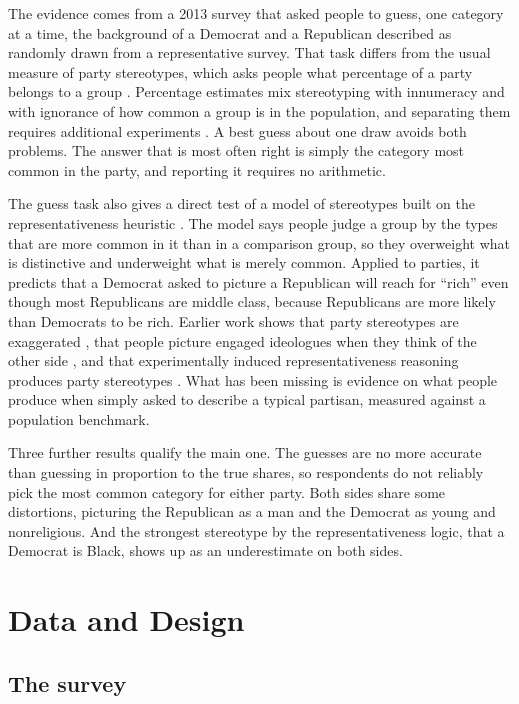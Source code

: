 \documentclass[11pt]{article}
\begin{document}
The evidence comes from a 2013 survey that asked people to guess, one category at a time, the background of a Democrat and a Republican described as randomly drawn from a representative survey. That task differs from the usual measure of party stereotypes, which asks people what percentage of a party belongs to a group \citep{ahler2018parties, levendusky2016misperceptions}. Percentage estimates mix stereotyping with innumeracy and with ignorance of how common a group is in the population, and separating them requires additional experiments \citep{ahler2018parties}. A best guess about one draw avoids both problems. The answer that is most often right is simply the category most common in the party, and reporting it requires no arithmetic.

The guess task also gives a direct test of a model of stereotypes built on the representativeness heuristic \citep{kahneman1972subjective, bordalo2016stereotypes}. The model says people judge a group by the types that are more common in it than in a comparison group, so they overweight what is distinctive and underweight what is merely common. Applied to parties, it predicts that a Democrat asked to picture a Republican will reach for ``rich'' even though most Republicans are middle class, because Republicans are more likely than Democrats to be rich. Earlier work shows that party stereotypes are exaggerated \citep{ahler2018parties, rothschild2019pigeonholing}, that people picture engaged ideologues when they think of the other side \citep{druckman2022misestimating}, and that experimentally induced representativeness reasoning produces party stereotypes \citep{ahler2023typecast}. What has been missing is evidence on what people produce when simply asked to describe a typical partisan, measured against a population benchmark.

Three further results qualify the main one. The guesses are no more accurate than guessing in proportion to the true shares, so respondents do not reliably pick the most common category for either party. Both sides share some distortions, picturing the Republican as a man and the Democrat as young and nonreligious. And the strongest stereotype by the representativeness logic, that a Democrat is Black, shows up as an underestimate on both sides.

\section{Data and Design}

\subsection{The survey}
\end{document}
